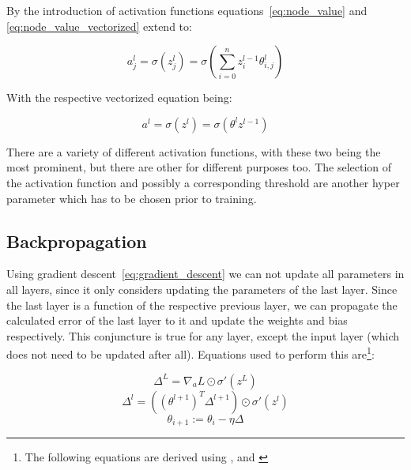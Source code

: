 By the introduction of activation functions equations~\eqref{eq:node_value} and \eqref{eq:node_value_vectorized} extend to:

\begin{equation}
    a^l_j = \sigma(z^l_j) = \sigma(\sum^n_{i=0}z^{l-1}_i\theta^l_{i, j})
    \label{eq:activation}
\end{equation}

With the respective vectorized equation being:

\begin{equation}
    a^l = \sigma(z^l) = \sigma(\theta^l z^{l-1})
    \label{eq:activation_vectorized}
\end{equation}

There are a variety of different activation functions, with these two being the most prominent, but there are other for different purposes too. The selection of the activation function and possibly a corresponding threshold are another hyper parameter which has to be chosen prior to training.

\subsection{Backpropagation}

Using gradient descent~\eqref{eq:gradient_descent} we can not update all parameters in all layers, since it only considers updating the parameters of the last layer.
Since the last layer is a function of the respective previous layer, we can propagate the calculated error of the last layer to it and update the weights and bias respectively. This conjuncture is true for any layer, except the input layer (which does not need to be updated after all).
Equations used to perform this are\footnote{The following equations are derived using \cite[p.733]{StuartRussell2018}, \cite[p.197]{Goodfellow2017} and \cite[ch.2]{Nielsen2015}}:

\begin{equation}
    \varDelta^L = \nabla_a L \odot \sigma'(z^L)
    \label{eq:output_error}
\end{equation}
\begin{equation}
    \varDelta^l = ((\theta^{l+1})^T \varDelta^{l+1}) \odot \sigma'(z^l)
    \label{eq:hidden_error}
\end{equation}
\begin{equation}
    \theta_{i+1} := \theta_i - \eta \varDelta
    \label{eq:backprop_update}
\end{equation}

